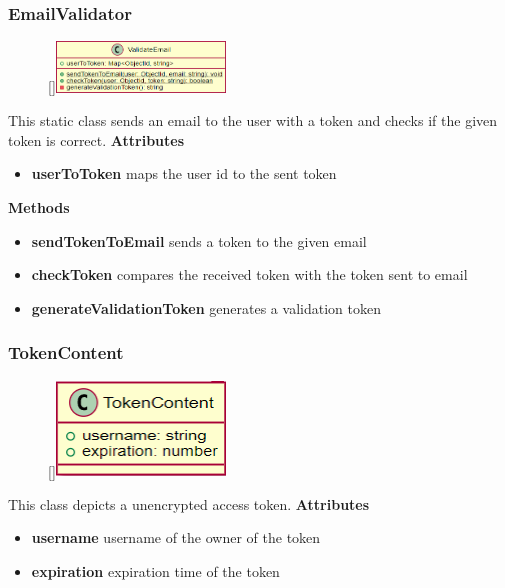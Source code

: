 \subsubsection{EmailValidator}
\label{EmailValidator}
\begin{figure}
    \raisebox{0pt}[\dimexpr{}\baselineskip\relax]{\includegraphics[width=4.5cm]{classes/auth/3.png}}
\end{figure} 
\par
This static class sends an email to the user with a token and checks if the given token is correct.
\newline
\newline
\textbf{Attributes}
\begin{itemize}
    \item \textbf{userToToken} maps the user id to the sent token
\end{itemize}
\textbf{Methods}
\begin{itemize}
    \item \textbf{sendTokenToEmail} sends a token to the given email 
    \item \textbf{checkToken} compares the received token with the token sent to email
    \item \textbf{generateValidationToken} generates a validation token
\end{itemize}

\subsubsection{TokenContent}
\label{TokenContent}
\begin{figure}
    \raisebox{0pt}[\dimexpr{}\baselineskip\relax]{\includegraphics[width=4.5cm]{classes/auth/4.png}}
\end{figure} 
\par
This class depicts a unencrypted access token.
\newline
\newline
\textbf{Attributes}
\begin{itemize}
    \item \textbf{username} username of the owner of the token
    \item \textbf{expiration} expiration time of the token
\end{itemize}

